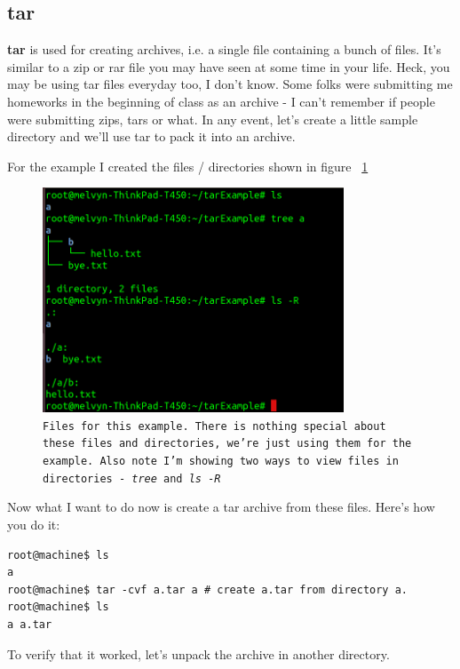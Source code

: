 \documentclass[12pt,a4paper]{article}
\begin{document}
\subsection{tar}
\textbf{tar} is used for creating archives, i.e. a single file containing a bunch of
files. It's similar to a zip or rar file you may have seen at some time in your
life. Heck, you may be using tar files everyday too, I don't know. Some folks
were submitting me homeworks in the beginning of class as an archive - I can't
remember if people were submitting zips, tars or what. In any event, let's
create a little sample directory  and we'll use tar to pack it into an archive.


For the example I created the files / directories shown in figure
~\ref{fig:tarExample1}

\begin{figure}[h]
\centering
	\includegraphics[width=0.8\textwidth]{Images/tarExample1.png}
	\caption{{\small \texttt{Files for this example. There is nothing special about these files
and directories, we're just using them for the example. Also note I'm showing
two ways to view files in directories - \textit{tree} and \textit{ ls -R}}}}
	\label{fig:tarExample1}
\end{figure}


Now what I want to do now is create a tar archive from these files. Here's how
you do it:

\begin{lstlisting}[style=term]
root@machine$ ls
a
root@machine$ tar -cvf a.tar a # create a.tar from directory a. 
root@machine$ ls 
a a.tar
\end{lstlisting}

To verify that it worked, let's unpack the archive in another directory.
\end{document}
